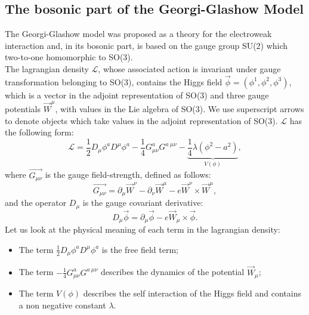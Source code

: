 \documentclass[main.tex]{subfiles}
\begin{document}
\subsection{The bosonic part of the Georgi-Glashow Model}
The Georgi-Glashow model was proposed as a theory for the electroweak interaction and, in its bosonic part, is based on the gauge group SU(2) which two-to-one homomorphic to SO(3).\\
The lagrangian density $\mathcal{L}$, whose associated action is invariant under gauge transformation belonging to SO(3), contains the Higgs field $\vec{\phi} = ( \phi^1, \phi^2 , \phi^3)$, which is a vector in the adjoint representation of SO(3) and three gauge potentials $\Vec{W}^\mu$, with values in the Lie algebra of SO(3). 
We use superscript arrows to denote objects which take values in the adjoint representation of SO(3).
$\mathcal{L}$ has the following form: 
\begin{equation}
\mathcal{L}= \frac{1}{2}D_{\mu}\phi^a D^\mu \phi^a  -\frac{1}{4} G_{\mu \nu}^a G^{a \ \mu \nu} - \underbrace{\frac{1}{4}\lambda (\phi^2 -a^2)}_{V(\phi)},
\label{eq:lag}
\end{equation}
where $\Vec{G_{\mu \nu}}$ is the gauge field-strength, defined as follows:
\begin{equation}
\Vec{G_{\mu \nu}} = \partial_{\mu}  \Vec{W}^\nu -\partial_{\nu}  \Vec{W}^\mu - e \Vec{W}^\nu \times \Vec{W}^\mu,
\end{equation}
and the operator $D_{\mu}$ is the gauge covariant derivative: 
\begin{equation}
D_\mu \Vec{\phi} = \partial_\mu \Vec{\phi} - e \Vec{W}_\mu \times \Vec{\phi}.
\end{equation}
Let us look at the physical meaning of each term in the lagrangian density:
\begin{itemize}
    \item The term $\frac{1}{2}D_{\mu}\phi^a D^\mu \phi^a $ is the free field term;
    \item The term  $-\frac{1}{4} G_{\mu \nu}^a G^{a \ \mu \nu}$ describes the dynamics of the potential $\Vec{W}_{\mu}$;
    \item The term  $V(\phi) $ describes the self interaction of the Higgs field and contains a non negative constant $\lambda$.
\end{itemize}
\end{document}
